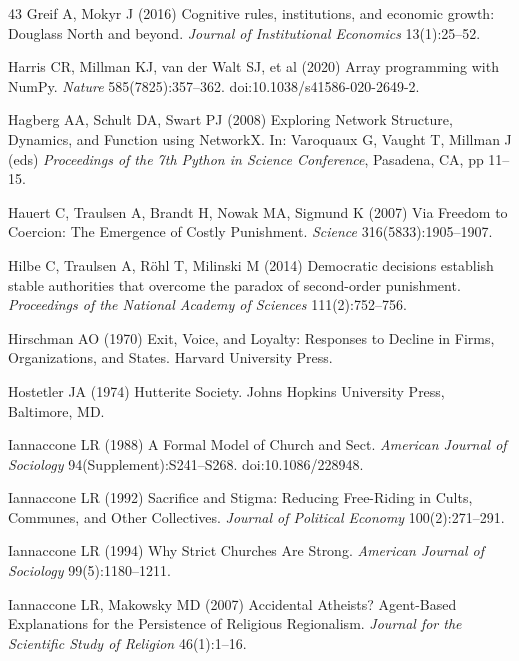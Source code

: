 \documentclass[12pt]{article}
\begin{document}
\begin{thebibliography}{43}
Greif A, Mokyr J (2016) Cognitive rules, institutions, and economic growth: Douglass North and beyond. \textit{Journal of Institutional Economics} 13(1):25--52.

Harris CR, Millman KJ, van der Walt SJ, et al (2020) Array programming with NumPy. \textit{Nature} 585(7825):357--362. doi:10.1038/s41586-020-2649-2.

Hagberg AA, Schult DA, Swart PJ (2008) Exploring Network Structure, Dynamics, and Function using NetworkX. In: Varoquaux G, Vaught T, Millman J (eds) \textit{Proceedings of the 7th Python in Science Conference}, Pasadena, CA, pp 11--15.

Hauert C, Traulsen A, Brandt H, Nowak MA, Sigmund K (2007) Via Freedom to Coercion: The Emergence of Costly Punishment. \textit{Science} 316(5833):1905--1907.

Hilbe C, Traulsen A, R\"ohl T, Milinski M (2014) Democratic decisions establish stable authorities that overcome the paradox of second-order punishment. \textit{Proceedings of the National Academy of Sciences} 111(2):752--756.

Hirschman AO (1970) Exit, Voice, and Loyalty: Responses to Decline in Firms, Organizations, and States. Harvard University Press.

Hostetler JA (1974) Hutterite Society. Johns Hopkins University Press, Baltimore, MD.

Iannaccone LR (1988) A Formal Model of Church and Sect. \textit{American Journal of Sociology} 94(Supplement):S241--S268. doi:10.1086/228948.

Iannaccone LR (1992) Sacrifice and Stigma: Reducing Free-Riding in Cults, Communes, and Other Collectives. \textit{Journal of Political Economy} 100(2):271--291.

Iannaccone LR (1994) Why Strict Churches Are Strong. \textit{American Journal of Sociology} 99(5):1180--1211.

Iannaccone LR, Makowsky MD (2007) Accidental Atheists? Agent-Based Explanations for the Persistence of Religious Regionalism. \textit{Journal for the Scientific Study of Religion} 46(1):1--16.


\end{thebibliography}
\end{document}

